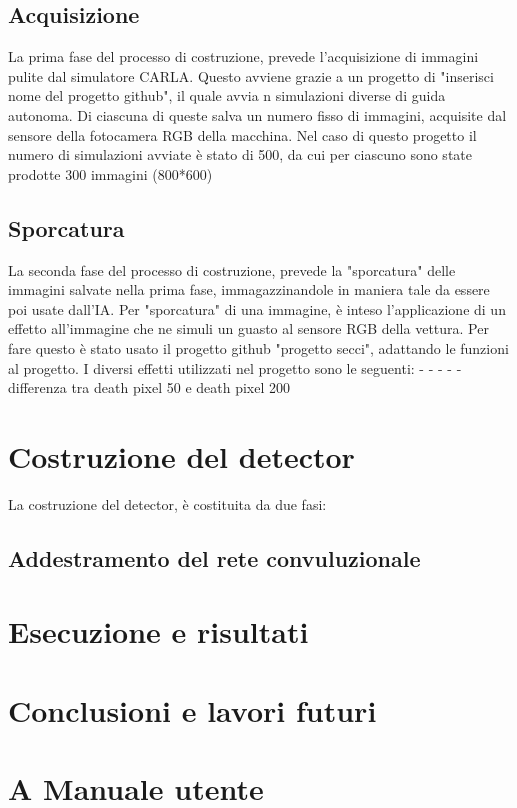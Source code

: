 \documentclass[14pt]{extarticle}
\begin{document}
\subsection{Acquisizione}
La prima fase del processo di costruzione, prevede l'acquisizione di immagini pulite dal simulatore CARLA. Questo avviene grazie a un progetto di "inserisci nome del progetto github", il quale avvia n simulazioni diverse di guida autonoma. Di ciascuna di queste salva un numero fisso di immagini, acquisite dal sensore della fotocamera RGB della macchina.
Nel caso di questo progetto il numero di simulazioni avviate è stato di 500, da cui per ciascuno sono state prodotte 300 immagini (800*600)
\subsection{Sporcatura}
La seconda fase del processo di costruzione, prevede la "sporcatura" delle immagini salvate nella prima fase, immagazzinandole in maniera tale da essere poi usate dall'IA.
Per "sporcatura" di una immagine, è inteso l'applicazione di un effetto all'immagine che ne simuli un guasto al sensore RGB della vettura.
Per fare questo è stato usato il progetto github "progetto secci", adattando le funzioni al progetto.
I diversi effetti utilizzati nel progetto sono le seguenti:
-
-
-
-
-
differenza tra death pixel 50 e death pixel 200 

\section{Costruzione del detector}
La costruzione del detector, è costituita da due fasi:
\subsection{Addestramento del rete convuluzionale}




\section{Esecuzione e risultati}

\section{Conclusioni e lavori futuri}

\section{A Manuale utente}
\printindex
\end{document}
